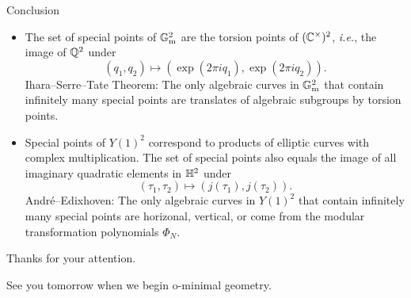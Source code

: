\documentclass{beamer}
\begin{document}
\begin{frame}{Conclusion}

  \begin{itemize}
  \item The set of special points of ${\mathbb{G}}_{\mathrm{m}}^2$ are the
    torsion points of $({\mathbb{C}}^\times)^2$, \textit{i.e.},  the image
    of ${\mathbb{Q}}^2$ under $$(q_1,q_2)\mapsto (\exp(2\pi i
    q_1),\exp(2\pi iq_2)).$$ 
    Ihara--Serre--Tate Theorem: The only algebraic curves in ${\mathbb{G}}_{\mathrm{m}}^2$ that
    contain infinitely many special points are translates of algebraic
    subgroups by torsion points.

  \item Special points of $Y(1)^2$  correspond
    to products of elliptic curves with complex multiplication. The
    set of special points also equals 
    the image of all imaginary quadratic elements in
    ${\mathbb{H}}^2$ under
    $$ (\tau_1,\tau_2) \mapsto (j(\tau_1),j(\tau_2)).$$
    Andr\'e--Edixhoven: The only algebraic curves in $Y(1)^2$ that
    contain infinitely many special points are horizonal, vertical, or
    come from the modular transformation polynomials $\Phi_N$. 
  \end{itemize}
\end{frame}

\begin{frame}
  \begin{center}
    Thanks for your attention.

    See you tomorrow when we begin o-minimal geometry.
  \end{center}
\end{frame}
\end{document}
